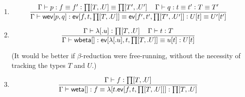 \documentclass[11pt]{article}
\newcommand{\eqd}{\equiv}
\newcommand\spc{{\,\,\,\,\,\,\,}}
\newcommand{\ccolon}{\vcentcolon}
\newcommand{\ccheck}{\vcentcolon}            %
\newcommand{\Type}{\mathop{\text{ \sc type}}}
\newcommand{\Okay}{\mathop{\text{ \sc okay}}}
\newcommand{\Context}{\vdash\Okay}
\renewcommand{\Context}{\vdash}
\newcommand{\ha}[2]{#1[#2]}
\newcommand{\weta}{{\sf weta}}
\newcommand{\annot}{{\sf annot}}
\newcommand{\haa}[2]{\ha\annot{#1,#2}}
\renewcommand{\haa}[2]{#1}
\newcommand{\ev}{{\sf ev}}
\newcommand{\wbeta}{{\sf wbeta}}
\newcommand{\weveq}{{\sf wev}}
\newcommand{\var}{\char`_}
\newcommand{\defn}{\vcentcolon\equiv}
\begin{document}
\begin{enumerate}

Question: what makes the sentence $$\Gamma \vdash U[\haa t T] \Type $$
checkable, in the context above?

\item 
\[\frac{
   \Gamma \vdash p : f \eqd f' \ccolon {\ha\prod{T,.U}} \eqd {\ha\prod{T',.U'}} 
   \spc 
   \Gamma \vdash q : t \eqd t' \ccolon T \eqd T'
   }{
   \Gamma \vdash \ha\weveq{p,q} : \ha\ev{f,t,{\ha\prod{T,.U}}} \eqd \ha\ev{f',t',{\ha\prod{T',.U'}}} \ccolon U[\haa t T] \eqd U'[\haa {t'} {T'}]
  }\]

\item 
\[\frac{
  \Gamma \vdash \ha\lambda{.u} \ccheck {\ha\prod{T,.U}}
  \spc
  \Gamma \vdash t \ccheck{T} 
  }{
  \Gamma \vdash \ha\wbeta{} : \ha\ev{\ha\lambda{.u},t,{\ha\prod{T,.U}}} \eqd u[\haa{t}{T}] : U[\haa{t}{T}]
}\]


(It would be better if $\beta$-reduction were free-running, without the
necessity of tracking the types $T$ and $U$.)

\item 
\[
  \frac{\Gamma \vdash f \ccheck{\ha\prod{T,.U}}}
       {\Gamma \vdash \ha\weta{} : f \eqd \ha\lambda{t.\ha\ev{f,t,{\ha\prod{T,.U}}}} : \ha\prod{T,.U}
       }
\]

\end{enumerate}



\end{document}
